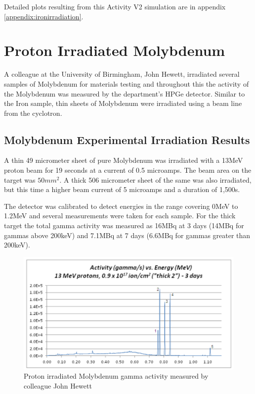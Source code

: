 Detailed plots resulting from this Activity V2 simulation are in appendix \ref{appendix:ironirradiation}.





\section{Proton Irradiated Molybdenum}

A colleague at the University of Birmingham, John Hewett, irradiated several samples of Molybdenum for materials testing and throughout this the activity of the Molybdenum was measured by the department's HPGe detector\cite{johnhewett}.  Similar to the Iron sample, thin sheets of Molybdenum were irradiated using a beam line from the cyclotron.


\subsection[Experimental Irradiation - Molybdenum]{Molybdenum Experimental Irradiation Results}

A thin 49 micrometer sheet of pure Molybdenum was irradiated with a 13MeV proton beam for 19 seconds at a current of 0.5 microamps.  The beam area on the target was $50mm^2$.  A thick 506 micrometer sheet of the same was also irradiated, but this time a higher beam current of  5 microamps and a duration of 1,500s.

The detector was calibrated to detect energies in the range covering 0MeV to 1.2MeV and several measurements were taken for each sample.  For the thick target the total gamma activity was measured as 16MBq at 3 days (14MBq for gammas above 200keV) and 7.1MBq at 7 days (6.6MBq for gammas greater than 200keV).

\begin{figure}[htb]
\centering
\includegraphics[width=0.7\linewidth]{chapters/activity_code/mo-john-hewett/john_mo_results.png}
\caption{Proton irradiated Molybdenum gamma activity measured by colleague John Hewett}
\label{fig:john-hewett-mo}
\end{figure}

